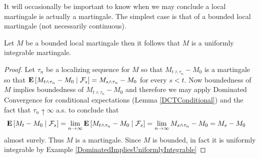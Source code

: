 It will occasionally be important to know when we may conclude a local martingale is actually a martingale.  The simplest case is that of a bounded local martingale (not necessarily continuous).
\begin{lem}\label{BoundedLocalMartingaleIsMartingale}Let $M$ be a bounded local martingale then it follows that $M$ is a uniformly integrable martingale.
\end{lem}
\begin{proof}
Let $\tau_n$ be a localizing sequence for $M$ so that $M_{t \wedge \tau_n} - M_0$ is a martingale so that $\cexpectationlong{\mathcal{F}_s}{M_{t \wedge \tau_n} - M_0} = M_{s \wedge \tau_n} - M_0$ for every $s < t$.  Now boundedness of $M$ implies boundedness of $M_{t \wedge \tau_n} - M_0$ and therefore we may apply Dominated Convergence for conditional expectations (Lemma \ref{DCTConditional}) and the fact that $\tau_n \uparrow \infty$ a.s. to conclude that 
\begin{align*}
\cexpectationlong{\mathcal{F}_s}{M_{t} - M_0} &= \lim_{n \to \infty} \cexpectationlong{\mathcal{F}_s}{M_{t \wedge \tau_n} - M_0} = \lim_{n\to \infty} M_{s \wedge \tau_n} - M_0 =  M_{s} - M_0 
\end{align*}
almost surely.  Thus $M$ is a martingale.  Since $M$ is bounded, in fact it is uniformly integrable by Example \ref{DominatedImpliesUniformlyIntegrable}
\end{proof}

